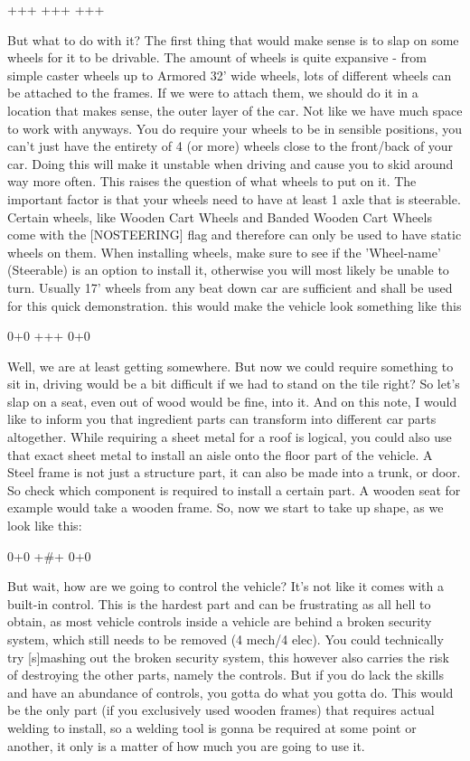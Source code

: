 \documentclass[11pt]{report}
\begin{document}
+++
+++
+++

But what to do with it? The first thing that would make sense is to slap on some wheels for it to be drivable. The amount of wheels is quite expansive - from simple caster wheels up to Armored 32' wide wheels, lots of different wheels can be attached to the frames. If we were to attach them, we should do it in a location that makes sense, the outer layer of the car. Not like we have much space to work with anyways.
You do require your wheels to be in sensible positions, you can't just have the entirety of 4 (or more) wheels close to the front/back of your car. Doing this will make it unstable when driving and cause you to skid around way more often.
This raises the question of what wheels to put on it. The important factor is that your wheels need to have at least 1 axle that is steerable. Certain wheels, like Wooden Cart Wheels and Banded Wooden Cart Wheels come with the [NOSTEERING] flag and therefore can only be used to have static wheels on them. When installing wheels, make sure to see if the 'Wheel-name' (Steerable) is an option to install it, otherwise you will most likely be unable to turn. Usually 17' wheels from any beat down car are sufficient and shall be used for this quick demonstration.
this would make the vehicle look something like this

0+0
+++
0+0

Well, we are at least getting somewhere. But now we could require something to sit in, driving would be a bit difficult if we had to stand on the tile right? So let's slap on a seat, even out of wood would be fine, into it.
And on this note, I would like to inform you that ingredient parts can transform into different car parts altogether. While requiring a sheet metal for a roof is logical, you could also use that exact sheet metal to install an aisle onto the floor part of the vehicle. A Steel frame is not just a structure part, it can also be made into a trunk, or door. So check which component is required to install a certain part. A wooden seat for example would take a wooden frame.
So, now we start to take up shape, as we look like this:

0+0
+\#+
0+0

But wait, how are we going to control the vehicle? It's not like it comes with a built-in control. This is the hardest part and can be frustrating as all hell to obtain, as most vehicle controls inside a vehicle are behind a broken security system, which still needs to be removed (4 mech/4 elec). You could technically try [s]mashing out the broken security system, this however also carries the risk of destroying the other parts, namely the controls. But if you do lack the skills and have an abundance of controls, you gotta do what you gotta do.
This would be the only part (if you exclusively used wooden frames) that requires actual welding to install, so a welding tool is gonna be required at some point or another, it only is a matter of how much you are going to use it.
\end{document}
